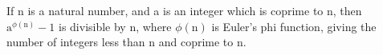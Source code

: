 If n is a natural number, and a is an integer which is coprime to n,
then $ \mathrm{a} ^{\phi ( \mathrm{n} ) } -1 $ is divisible by n, where
$ \phi ( \mathrm{n} ) $ is Euler's phi function, giving the number of
integers less than n and coprime to n.